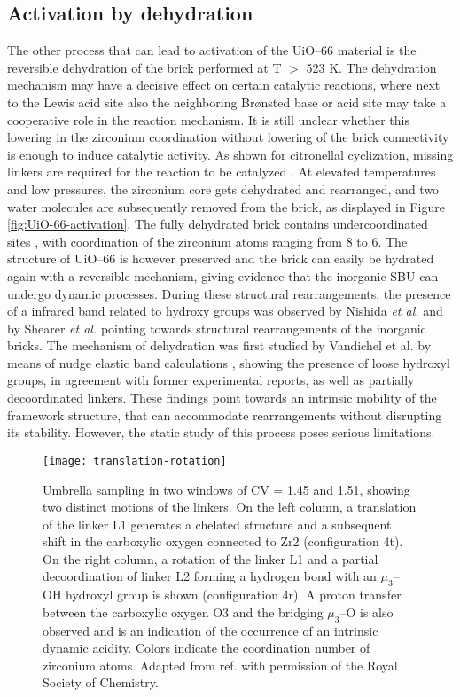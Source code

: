 \subsection*{Activation by dehydration}
The other process that can lead to activation of the UiO--66 material is the reversible dehydration of the brick performed at T $>$ 523 K. The dehydration mechanism may have a decisive effect on certain catalytic reactions, where next to the Lewis acid site also the neighboring Br\o{}nsted base or acid site may take a cooperative role in the reaction mechanism. It is still unclear whether this lowering in the zirconium coordination without lowering of the brick connectivity is enough to induce catalytic activity. As shown for citronellal cyclization, missing linkers are required for the reaction to be catalyzed \cite{vermoortele2012electronic}. 
\npar
At elevated temperatures and low pressures, the zirconium core gets dehydrated and rearranged, and two water molecules are subsequently removed from the brick, as displayed in Figure \ref{fig:UiO-66-activation}. The fully dehydrated  brick contains undercoordinated sites \cite{valenzano2011disclosing, decoste2013stability, shearer2013situ, vandichel2015active}, with coordination of the zirconium atoms ranging from 8 to 6. The structure of UiO--66 is however preserved and the brick can easily be hydrated again with a reversible mechanism, giving evidence that the inorganic SBU can undergo dynamic processes. During these structural rearrangements, the presence of a infrared band related to hydroxy groups was observed by Nishida \textit{et al.} \cite{nishida2014structural} and by Shearer \textit{et al.} \cite{shearer2013situ} pointing towards structural rearrangements of the inorganic bricks. The mechanism of dehydration was first studied by Vandichel et al. by means of nudge elastic band calculations \cite{vandichel2016water}, showing the presence of loose hydroxyl groups, in agreement with former experimental reports, as well as partially decoordinated linkers. These findings point towards an intrinsic mobility of the framework structure, that can accommodate rearrangements without disrupting its stability. However, the static study of this process poses serious limitations. 
\begin{figure}[!htbp]
	\centering
	\texttt{[image: translation-rotation]}
	\caption{Umbrella sampling in two windows of CV = 1.45 and 1.51, showing two distinct motions of the linkers. On the left column, a translation of the linker L1 generates a chelated structure and a subsequent shift in the carboxylic oxygen connected to Zr2 (configuration 4t). On the right column, a rotation of the linker L1 and a partial decoordination of linker L2 forming a hydrogen bond with an $\mu_3$--OH hydroxyl group is shown (configuration 4r). A proton transfer between the carboxylic oxygen O3 and the bridging $\mu_3$--O is also observed and is an indication of the occurrence of an intrinsic dynamic acidity. Colors indicate the coordination number of zirconium atoms. Adapted from ref. \cite{hajek2018intrinsic} with permission of the Royal Society of Chemistry.}
	\label{fig:translation-rotation}
\end{figure}
